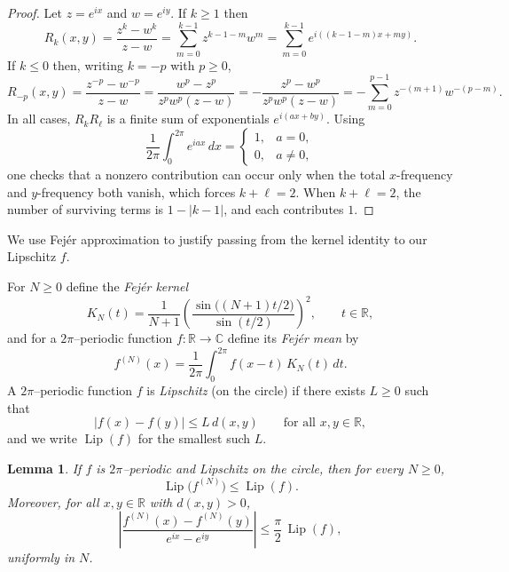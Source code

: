 \documentclass{article}
\newtheorem{lem}[thr]{Lemma}
\theoremstyle{definition}
\let\le\leqslant
\let\ge\geqslant
\DeclareMathOperator{\Lip}{Lip}
\begin{document}
\begin{proof}
Let $z=e^{ix}$ and $w=e^{iy}$.
If $k\ge1$ then
\[
R_k(x,y)=\frac{z^k-w^k}{z-w}=\sum_{m=0}^{k-1} z^{k-1-m}w^m
=\sum_{m=0}^{k-1} e^{i((k-1-m)x+my)}.
\]
If $k\le0$ then, writing $k=-p$ with $p\ge0$,
\[
R_{-p}(x,y)=\frac{z^{-p}-w^{-p}}{z-w}
=\frac{w^p-z^p}{z^p w^p(z-w)}
=-\frac{z^p-w^p}{z^p w^p(z-w)}
=-\sum_{m=0}^{p-1} z^{-(m+1)}w^{-(p-m)}.
\]
In all cases, $R_kR_\ell$ is a finite sum of exponentials $e^{i(ax+by)}$.
Using
\[
\frac{1}{2\pi}\int_0^{2\pi} e^{iax}\,dx=
\begin{cases}
1,& a=0,\\
0,& a\neq 0,
\end{cases}
\]
one checks that a nonzero contribution can occur only when the total $x$-frequency and $y$-frequency both vanish,
which forces $k+\ell=2$.
When $k+\ell=2$, the number of surviving terms is $1-|k-1|$, and each contributes $1$.
\end{proof}


We use Fej\'er approximation to justify passing from the kernel identity to our Lipschitz $f$.



For $N\ge 0$ define the \emph{Fej\'er kernel}
\begin{equation}\label{eq:FejerKernelDef}
K_N(t)=\frac{1}{N+1}\left(\frac{\sin \bigl((N+1)t/2\bigr)}{\sin(t/2)}\right)^2,
\qquad t\in\mathbb R,
\end{equation}
and for a $2\pi$--periodic function $f:\mathbb R\to\mathbb C$ define its \emph{Fej\'er mean} by
\begin{equation}\label{eq:FejerMeanDef}
f^{(N)}(x)=\frac{1}{2\pi}\int_{0}^{2\pi} f(x-t)\,K_N(t)\,dt.
\end{equation}
A $2\pi$--periodic function $f$ is \emph{Lipschitz} (on the circle) if there exists $L\ge 0$ such that
\begin{equation}\label{eq:LipDef}
|f(x)-f(y)|\le L\,d(x,y)\qquad \text{for all }x,y\in\mathbb R,
\end{equation}
and we write $\Lip(f)$ for the smallest such $L$.

\begin{lem}\label{lem:FejerLip}
If $f$ is $2\pi$--periodic and Lipschitz on the circle, then for every $N\ge 0$,
\[
\Lip\bigl(f^{(N)}\bigr)\le \Lip(f).
\]
Moreover, for all $x,y\in\mathbb R$ with $d(x,y)>0$,
\[
\left|\frac{f^{(N)}(x)-f^{(N)}(y)}{e^{ix}-e^{iy}}\right|
\le \frac{\pi}{2}\,\Lip(f),
\]
uniformly in $N$.
\end{lem}
\end{document}
